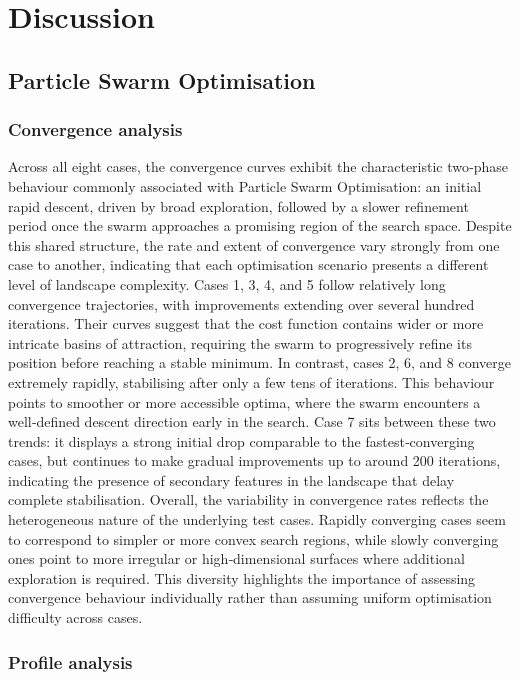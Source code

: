 \section{Discussion}

\subsection{Particle Swarm Optimisation}

\subsubsection{Convergence analysis}

Across all eight cases, the convergence curves exhibit the characteristic two‑phase behaviour commonly associated with Particle Swarm Optimisation: an initial rapid descent, driven by broad exploration, followed by a slower refinement period once the swarm approaches a promising region of the search space. Despite this shared structure, the rate and extent of convergence vary strongly from one case to another, indicating that each optimisation scenario presents a different level of landscape complexity. Cases 1, 3, 4, and 5 follow relatively long convergence trajectories, with improvements extending over several hundred iterations. Their curves suggest that the cost function contains wider or more intricate basins of attraction, requiring the swarm to progressively refine its position before reaching a stable minimum. In contrast, cases 2, 6, and 8 converge extremely rapidly, stabilising after only a few tens of iterations. This behaviour points to smoother or more accessible optima, where the swarm encounters a well‑defined descent direction early in the search. Case 7 sits between these two trends: it displays a strong initial drop comparable to the fastest‑converging cases, but continues to make gradual improvements up to around 200 iterations, indicating the presence of secondary features in the landscape that delay complete stabilisation. Overall, the variability in convergence rates reflects the heterogeneous nature of the underlying test cases. Rapidly converging cases seem to correspond to simpler or more convex search regions, while slowly converging ones point to more irregular or high‑dimensional surfaces where additional exploration is required. This diversity highlights the importance of assessing convergence behaviour individually rather than assuming uniform optimisation difficulty across cases.

\subsubsection{Profile analysis}

